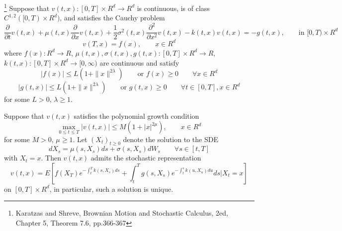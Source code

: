 \begin{theorem} \label{T:kac_diff2}
\footnote{Karatzas and Shreve, Brownian Motion and Stochastic Calculus, 2ed,
  Chapter 5, Theorem 7.6, pp.366-367} 
Suppose that $v(t,x):[0,T]\times R^d\to R^d$ is continuous, is of class 
$C^{1,2}([0,T)\times R^d)$, and satisfies the Cauchy problem
\begin{equation}
  \frac{\partial}{\partial t} v(t,x) 
  + \mu(t,x) \frac{\partial}{\partial x} v(t,x) 
  + \frac{1}{2} \sigma^2(t,x) \frac{\partial^2}{\partial x^2} v(t,x) 
  - k(t,x) v(t,x) = -g(t,x),  \qquad \text{in $[0,T)\times R^d$}
\end{equation}
\begin{equation}
  v(T,x)= f(x), \qquad x\in R^d
\end{equation}
where $f(x):R^d\to R$, $\mu(t,x),\sigma(t,x),g(t,x):[0,T]\times R^d\to R$, 
$k(t,x):[0,T]\times R^d\to [0,\infty)$ are continuous and satisfy 
\begin{equation} 
  |f(x)|\le L(1+ \| x \|^{2\lambda}) \qquad \text{or $f(x)\ge 0$}
   \qquad \forall x\in R^d
\end{equation} 
\begin{equation} 
  |g(t,x)|\le L(1+ \| x \|^{2\lambda}) \qquad \text{or $g(t,x)\ge 0$}
   \qquad \forall t\in [0,T], x\in R^d
\end{equation} 
for some $L>0$, $\lambda\ge 1$.

Suppose that $v(t,x)$ satisfies the polynomial growth condition 
\begin{equation}
  \max_{0\le t\le T} |v(t,x)| \le M(1+|x|^{2\mu}), \qquad x\in R^d
\end{equation}
for some $M>0$, $\mu\ge 1$. 
Let $(X_t)_{t\ge 0}$ denote the solution to the SDE
\[
  dX_s = \mu(s,X_s)ds + \sigma(s,X_s)dW_s \qquad \forall s\in [t,T]
\]
with $X_t=x$. Then $v(t,x)$ admits the stochastic representation
\begin{equation}
  v(t,x) = E\left[ 
              f(X_T) e^{-\int_t^T k(s,X_s) ds}  
              + \int_t^T g(s,X_s) e^{-\int_t^s k(u,X_u) du} ds \bigg| X_t = x
            \right]
\end{equation}
on $[0,T]\times R^d$, in particular, such a solution is unique.

\end{theorem}
